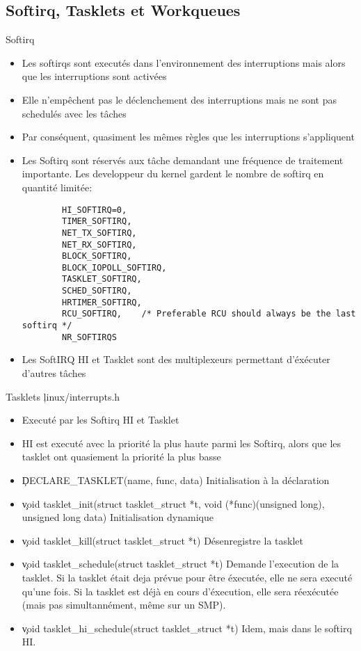 \subsection{Softirq, Tasklets et Workqueues}
\begin{frame}{Softirq}
\begin{itemize} 
\item Les softirqs sont executés dans l'environnement des interruptions mais alors que les interruptions sont activées
\item Elle n'empêchent pas le déclenchement des interruptions mais ne sont pas schedulés avec les tâches
\item Par conséquent, quasiment les mêmes règles que les interruptions s'appliquent
\item Les Softirq sont réservés aux tâche demandant une fréquence de traitement importante. Les developpeur du kernel gardent le nombre de softirq en quantité limitée:
\begin{lstlisting} 
        HI_SOFTIRQ=0,
        TIMER_SOFTIRQ,
        NET_TX_SOFTIRQ,
        NET_RX_SOFTIRQ,
        BLOCK_SOFTIRQ,
        BLOCK_IOPOLL_SOFTIRQ,
        TASKLET_SOFTIRQ,
        SCHED_SOFTIRQ,
        HRTIMER_SOFTIRQ,
        RCU_SOFTIRQ,    /* Preferable RCU should always be the last softirq */
        NR_SOFTIRQS
\end{lstlisting} 
\item Les SoftIRQ HI et Tasklet sont des multiplexeurs permettant d'éxécuter d'autres tâches
\end{itemize} 
\end{frame}

\begin{frame}{Tasklets}
\c{linux/interrupts.h}
\begin{itemize} 
\item Executé par les Softirq HI et Tasklet
\item HI est executé avec la priorité la plus haute parmi les Softirq, alors que les tasklet ont quasiement la priorité la plus basse
\item \c{DECLARE_TASKLET(name, func, data)} Initialisation à la déclaration
\item \c{void tasklet_init(struct tasklet_struct *t, void (*func)(unsigned long), unsigned long data)} Initialisation dynamique
\item \c{void tasklet_kill(struct tasklet_struct *t)} Désenregistre la tasklet
\item  \c{void  tasklet_schedule(struct  tasklet_struct  *t)}  Demande
  l'execution de la tasklet. Si la tasklet était deja prévue pour être
  éxecutée, elle ne  sera executé qu'une fois. Si  la tasklet est déjà
  en cours d'éxecution, elle sera réexécutée (mais pas simultannément,
  même sur un SMP).
\item  \c{void  tasklet_hi_schedule(struct  tasklet_struct *t)}  Idem,
  mais dans le softirq HI.
\end{itemize}
\end{frame} 

